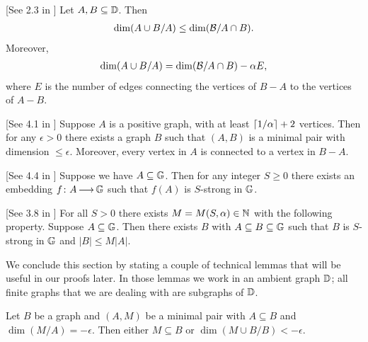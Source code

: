 \documentclass{amsart}
\begin{document}
\begin{Lemma} \label{diamond} [See 2.3 in \cite{laskowski}]
  Let $A, B \subseteq \mathbb D$.
  Then
  \begin{align*}
    \dim(A \cup B / A) \leq \dim(\mathcal B / A \cap B).
  \end{align*}
  Moreover, 
  \begin{align*}
    \dim(A \cup B / A) = \dim(\mathcal B / A \cap B) - \alpha E,
  \end{align*}
  where $E$ is the number of edges connecting the vertices of $B - A$ to the vertices of $A - B$.
\end{Lemma}

\begin{Lemma} \label{las_min} [See 4.1 in \cite{laskowski}]
  Suppose $A$ is a positive graph, with at least $\left \lceil 1/\alpha \right \rceil + 2$ vertices.
  Then for any $\epsilon > 0$ there exists a graph $B$ such that $(A, B)$ is a minimal pair with dimension $\leq \epsilon$.
  Moreover, every vertex in $A$ is connected to a vertex in $B - A$.
\end{Lemma}

\begin{Lemma} \label{las_str} [See 4.4 in \cite{laskowski}]
  Suppose we have $A \subseteq \mathbb G$.
  Then for any integer $S \geq 0$ there exists an embedding $f \colon A \operatorname{\longrightarrow} \mathbb G$ such that $f(A)$ is $S$-strong in $\mathbb G$.
\end{Lemma}
    
\begin{Lemma} \label{las_closure} [See 3.8 in \cite{laskowski}]
  For all $S > 0$ there exists $M = M(S, \alpha) \in \mathbb{N}$ with the following property.
  Suppose $A \subseteq \mathbb G$.
  Then there exists $B$ with $A \subseteq B \subseteq \mathbb G$ such that $B$ is $S$-strong in $\mathbb G$ and $|B| \leq M|A|$.
\end{Lemma}

We conclude this section by stating a couple of technical lemmas that will be useful in our proofs later.
In those lemmas we work in an ambient graph $\mathbb D$; all finite graphs that we are dealing with are subgraphs of $\mathbb D$.

\begin{Lemma} \label{minimal_over_set}
  Let $B$ be a graph and $(A, M)$ be a minimal pair with $A \subseteq B$ and $\dim(M/A) = -\epsilon$.
  Then either $M \subseteq B$ or $\dim(M \cup B/B) < -\epsilon$.
\end{Lemma}
\end{document}
